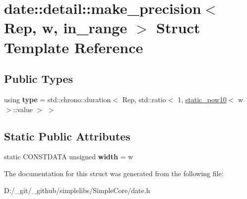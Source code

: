 \hypertarget{structdate_1_1detail_1_1make__precision}{}\section{date\+::detail\+::make\+\_\+precision$<$ Rep, w, in\+\_\+range $>$ Struct Template Reference}
\label{structdate_1_1detail_1_1make__precision}
\subsection*{Public Types}
\begin{DoxyCompactItemize}
\item 
\mbox{\label{structdate_1_1detail_1_1make__precision_a0d55736e11ee6f2a35c35d6d2ce3f7dd}} 
using {\bfseries type} = std\+::chrono\+::duration$<$ Rep, std\+::ratio$<$ 1, \mbox{\hyperlink{structdate_1_1detail_1_1static__pow10}{static\+\_\+pow10}}$<$ w $>$\+::value $>$ $>$
\end{DoxyCompactItemize}
\subsection*{Static Public Attributes}
\begin{DoxyCompactItemize}
\item 
\mbox{\label{structdate_1_1detail_1_1make__precision_a6c06b4458e2437a731abdba463722f5c}} 
static C\+O\+N\+S\+T\+D\+A\+TA unsigned {\bfseries width} = w
\end{DoxyCompactItemize}


The documentation for this struct was generated from the following file\+:\begin{DoxyCompactItemize}
\item 
D\+:/\+\_\+git/\+\_\+github/simplelibs/\+Simple\+Core/date.\+h\end{DoxyCompactItemize}
